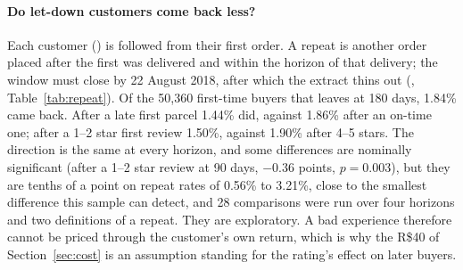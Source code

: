\paragraph{Do let-down customers come back less?} Each customer
() is followed from their first
order. A repeat is another order
placed after the first was delivered and within the horizon of that delivery;
the window must close by 22 August 2018, after which the extract thins out
(, Table~\ref{tab:repeat}). Of the 50{,}360 first-time
buyers that leaves at 180 days, 1.84\% came back. After a late first parcel
1.44\% did, against 1.86\% after an on-time one; after a 1--2 star first review
1.50\%, against 1.90\% after 4--5 stars. The direction is the same at every
horizon, and some differences are nominally significant (after a 1--2 star review
at 90 days, $-0.36$ points, $p = 0.003$), but they are tenths of a point on
repeat rates of 0.56\% to 3.21\%, close to the smallest difference this sample
can detect, and 28 comparisons were run over four horizons and two definitions
of a repeat.
They are exploratory. A bad experience therefore cannot be priced through the
customer's own return, which is why the R\$40 of Section~\ref{sec:cost} is an
assumption standing for the rating's effect on later buyers.

